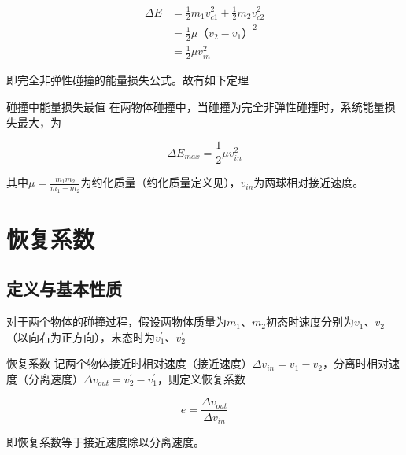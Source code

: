 \begin{subequations}
\begin{align*}
\Delta E &= \frac{1}{2} m_1 v_{c1}^2 + \frac{1}{2} m_2 v_{c2}^2 \\
&= \frac{1}{2} \mu （v_2 - v_1）^2 \\
&= \frac{1}{2} \mu v_{in}^2
\end{align*}
\end{subequations}

即完全非弹性碰撞的能量损失公式。故有如下定理

\begin{theo}{碰撞中能量损失最值}{}
在两物体碰撞中，当碰撞为完全非弹性碰撞时，系统能量损失最大，为

$$\Delta E_{max} = \frac{1}{2} \mu v_{in}^2$$

其中$\mu=\frac{m_1 m_2}{m_1 + m_2}$为约化质量（约化质量定义见），$v_{in}$为两球相对接近速度。
\end{theo}




\section{恢复系数}

\subsection{定义与基本性质}



对于两个物体的碰撞过程，假设两物体质量为$m_1$、$m_2$初态时速度分别为$v_1$、$v_2$（以向右为正方向），末态时为$v_1^{\prime}$、$v_2^{\prime}$

\begin{defi}{恢复系数}{}
记两个物体接近时相对速度（接近速度）$\Delta v_{in} = v_1-v_2$，分离时相对速度（分离速度）$\Delta v_{out} = v_2^{\prime}-v_1^{\prime}$，则定义恢复系数

$$e = \frac{\Delta v_{out}}{\Delta v_{in}}$$

即恢复系数等于接近速度除以分离速度。
\end{defi}

